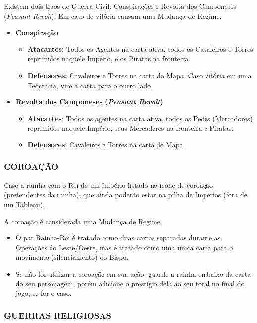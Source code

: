 \documentclass[11pt]{article}
\begin{document}
Existem dois tipos de Guerra Civil: Conspirações e Revolta dos Camponeses (\emph{Peasant Revolt}). Em caso de vitória causam uma Mudança de Regime.

\begin{itemize}
\item \textbf{Conspiração}
\begin{itemize}
\item \textbf{Atacantes:} Todos os Agentes na carta ativa, todos os Cavaleiros e Torres reprimidos naquele Império, e os Piratas na fronteira.
\item \textbf{Defensores:} Cavaleiros e Torres na carta do Mapa. Caso vitória em uma Teocracia, vire a carta para o outro lado.
\end{itemize}

\item \textbf{Revolta dos Camponeses (\emph{Peasant Revolt})}
\begin{itemize}
\item \textbf{Atacantes}: Todos os agentes na carta ativa, todos os Peões (Mercadores) reprimidos naquele Império, seus Mercadores na fronteira e Piratas.
\item \textbf{Defensores}: Cavaleiros e Torres na carta de Mapa.
\end{itemize}
\end{itemize}


\subsubsection{COROAÇÃO}
\label{sec:org551e211}

Case a rainha com o Rei de um Império listado no ícone de coroação (pretendentes da rainha), que ainda poderão estar na pilha de Impérios (fora de um Tableau).

A coroação é considerada uma Mudança de Regime.

\begin{itemize}
\item O par Rainha-Rei é tratado como duas cartas separadas durante as Operações do Leste/Oeste, mas é tratado como uma única carta para o movimento (silenciamento) do Bispo.

\item Se não for utilizar a coroação em sua ação, guarde a rainha embaixo da carta do seu personagem, porém adicione o prestígio dela ao seu total no final do jogo, se for o caso.
\end{itemize}

\subsubsection{GUERRAS RELIGIOSAS}
\label{sec:orgf1b23e1}
\end{document}
